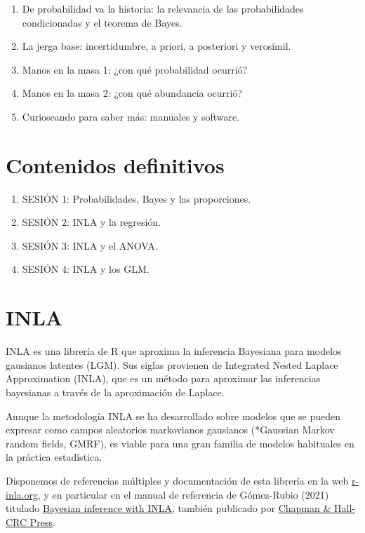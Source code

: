 \documentclass[
]{book}
\providecommand{\tightlist}{%
  \setlength{\itemsep}{0pt}\setlength{\parskip}{0pt}}
\begin{document}
\begin{enumerate}
\def\labelenumi{\arabic{enumi}.}
\tightlist
\item
  De probabilidad va la historia: la relevancia de las probabilidades condicionadas y el teorema de Bayes.
\item
  La jerga base: incertidumbre, a priori, a posteriori y verosímil.
\item
  Manos en la masa 1: ¿con qué probabilidad ocurrió?
\item
  Manos en la masa 2: ¿con qué abundancia ocurrió?
\item
  Curioseando para saber más: manuales y software.
\end{enumerate}

\hypertarget{contenidos-definitivos}{%
\section{Contenidos definitivos}\label{contenidos-definitivos}}

\begin{enumerate}
\def\labelenumi{\arabic{enumi}.}
\tightlist
\item
  SESIÓN 1: Probabilidades, Bayes y las proporciones.
\item
  SESIÓN 2: INLA y la regresión.
\item
  SESIÓN 3: INLA y el ANOVA.
\item
  SESIÓN 4: INLA y los GLM.
\end{enumerate}

\hypertarget{inla}{%
\section{INLA}\label{inla}}

INLA es una librería de R que aproxima la inferencia Bayesiana para
modelos gausianos latentes (LGM). Sus siglas provienen de Integrated
Nested Laplace Approximation (INLA), que es un método para aproximar las
inferencias bayesianas a través de la aproximación de Laplace.

Aunque la metodología INLA se ha desarrollado sobre modelos que se
pueden expresar como campos aleatorios markovianos gausianos (*Gaussian
Markov random fields, GMRF), es viable para una gran familia de modelos
habituales en la práctica estadística.

Disponemos de referencias múltiples y documentación de esta librería en
la web \href{https://www.r-inla.org}{r-inla.org}, y en particular en el
manual de referencia de Gómez-Rubio (2021) titulado \href{https://becarioprecario.bitbucket.io/inla-gitbook/index.html}{Bayesian inference
with
INLA},
también publicado por \href{https://www.routledge.com/Bayesian-inference-with-INLA/Gomez-Rubio/p/book/9781138039872}{Chapman \& Hall-CRC
Press}.
\end{document}
